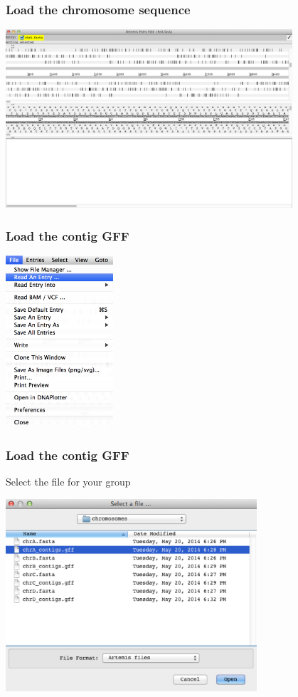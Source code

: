 \begin{frame}
  \frametitle{Load the chromosome sequence}
  \begin{center}
    \includegraphics[width=0.8\textwidth]{images/artemis_loaded_seq} 
  \end{center}
\end{frame}

\begin{frame}
  \frametitle{Load the contig GFF}
  \begin{center}
    \includegraphics[width=0.3\textwidth]{images/artemis_read_entry} 
  \end{center}
\end{frame}

\begin{frame}
  \frametitle{Load the contig GFF}
  Select the file for your group
  \begin{center}
    \includegraphics[width=0.7\textwidth]{images/artemis_select_contig_gff} 
  \end{center}
\end{frame}

